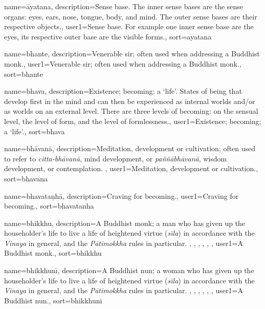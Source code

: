 {
name={\=ayatana},
description={Sense base. The inner sense bases are the sense organs: eyes, ears, nose, tongue, body, and mind. The outer sense bases are their respective objects.},
user1={Sense base. For example one inner sense base are the eyes, its respective outer base are the visible forms.},
sort={ayatana}
}

{
name={bhante},
description={Venerable sir; often used when addressing a Buddhist monk.},
user1={Venerable sir; often used when addressing a Buddhist monk.},
sort={bhante}
}

{
name={bhava},
description={Existence; becoming; a `life'. States of being that develop first in the mind and can then be experienced as internal worlds and/or as worlds on an external level. There are three levels of becoming: on the sensual level, the level of form, and the level of formlessness.},
user1={Existence; becoming; a `life'.},
sort={bhava}
}

{
name=bh\=avan\=a,
description={Meditation, development or cultivation; often used to refer to \textit{citta-bh\=avan\=a}, mind development, or \textit{pa\~n\~n\=abh\=avan\=a}, wisdom development, or contemplation. \protect \seepre %
\protect {}%
\protect \seepost %
},
user1={Meditation, development or cultivation.},
sort={bhavana}
}

{
name=bhavata\d{n}h\=a,
description={Craving for becoming.},
user1={Craving for becoming.},
sort={bhavatanha}
}

{
name={bhikkhu},
description={A Buddhist monk; a man who has given up the householder's life to live a life of heightened virtue (\textit{s\={\i}la}) in accordance with the \textit{Vinaya} in general, and the \textit{P\=atimokkha} rules in particular. \protect \seepre %
\protect {}, \protect {}, \protect {}, \protect {}, \protect {}, \protect {}%
\protect \seepost %
},
user1={A Buddhist monk.},
sort={bhikkhu}
}

{
name={bhikkhun\={\i}},
description={A Buddhist nun; a woman who has given up the householder's life to live a life of heightened virtue (\textit{s\={\i}la}) in accordance with the \textit{Vinaya} in general, and the \textit{P\=atimokkha} rules in particular. \protect \seepre %
\protect {}, \protect {}, \protect {}, \protect {}, \protect {}, \protect {}%
\protect \seepost %
},
user1={A Buddhist nun.},
sort={bhikkhuni}
}

